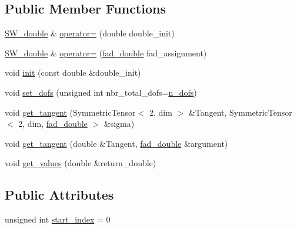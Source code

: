 \subsection*{Public Member Functions}
\begin{DoxyCompactItemize}
\item 
\hyperlink{classSacado__Wrapper_1_1SW__double}{S\+W\+\_\+double} \& \hyperlink{classSacado__Wrapper_1_1SW__double_a355de495ebe0e0b78ea4569fbb697717}{operator=} (double double\+\_\+init)
\item 
\hyperlink{classSacado__Wrapper_1_1SW__double}{S\+W\+\_\+double} \& \hyperlink{classSacado__Wrapper_1_1SW__double_ae9d242c29208f994f2eaabd9f5d5fa3c}{operator=} (\hyperlink{Sacado-auxiliary__functions_8h_a868b94676739e612d9c95940e70892a9}{fad\+\_\+double} fad\+\_\+assignment)
\item 
void \hyperlink{classSacado__Wrapper_1_1SW__double_adca799dd92dadebda9aebc91c797682a}{init} (const double \&double\+\_\+init)
\item 
void \hyperlink{classSacado__Wrapper_1_1SW__double_a36ced4218d40104fd8e548039a97cfb8}{set\+\_\+dofs} (unsigned int nbr\+\_\+total\+\_\+dofs=\hyperlink{classSacado__Wrapper_1_1SW__double_a45e46904e5fd5be42bb4c9bb7454ffc5}{n\+\_\+dofs})
\item 
void \hyperlink{classSacado__Wrapper_1_1SW__double_a2e6eca4457eb22b06172bb5749038f1e}{get\+\_\+tangent} (Symmetric\+Tensor$<$ 2, dim $>$ \&Tangent, Symmetric\+Tensor$<$ 2, dim, \hyperlink{Sacado-auxiliary__functions_8h_a868b94676739e612d9c95940e70892a9}{fad\+\_\+double} $>$ \&sigma)
\item 
void \hyperlink{classSacado__Wrapper_1_1SW__double_a468303caab70c91f72bfe0547afff53a}{get\+\_\+tangent} (double \&Tangent, \hyperlink{Sacado-auxiliary__functions_8h_a868b94676739e612d9c95940e70892a9}{fad\+\_\+double} \&argument)
\item 
void \hyperlink{classSacado__Wrapper_1_1SW__double_ae7e9f33604ea736e485576447d78a46c}{get\+\_\+values} (double \&return\+\_\+double)
\end{DoxyCompactItemize}
\subsection*{Public Attributes}
\begin{DoxyCompactItemize}
\item 
unsigned int \hyperlink{classSacado__Wrapper_1_1SW__double_aa0927ce06528899dd44afe5d770840c1}{start\+\_\+index} = 0
\end{DoxyCompactItemize}
